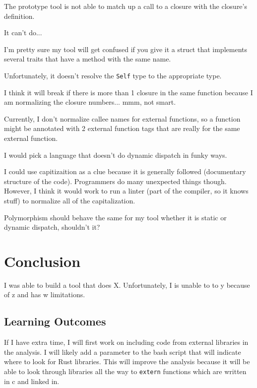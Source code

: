 \documentclass[11pt]{article}
\begin{document}
The prototype tool is not able to match up a call to a closure with the closure's definition.

It can't do...

I'm pretty sure my tool will get confused if you give it a struct that implements several traits that have a method with the same name.

Unfortunately, it doesn't resolve the \lstinline{Self} type to the appropriate type.

I think it will break if there is more than 1 closure in the same function because I am normalizing the closure numbers... mmm, not smart.

Currently, I don't normalize callee names for external functions, so a function might be annotated with 2 external function tags that are really for the same external function.

I would pick a language that doesn't do dynamic dispatch in funky ways.

I could use capitizaition as a clue because it is generally followed (documentary structure of the code).
Programmers do many unexpected things though.
However, I think it would work to run a linter (part of the compiler, so it knows stuff) to normalize all of the capitalization.

Polymorphism should behave the same for my tool whether it is static or dynamic dispatch, shouldn't it?

\section{Conclusion}
I was able to build a tool that does X.
Unfortunately, I is unable to to y because of z and has w limitations.

\subsection{Learning Outcomes}
If I have extra time, I will first work on including code from external libraries in the analysis.
I will likely add a parameter to the bash script that will indicate where to look for Rust libraries.
This will improve the analysis because it will be able to look through libraries all the way to \lstinline{extern} functions which are written in c and linked in.
\end{document}
